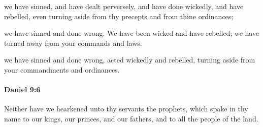 			\begin{versebox}
					\item[BHS] 
					\item[LXX] 
					\item[ASV] we have sinned, and have dealt perversely, and have done wickedly, and have rebelled, even turning aside from thy precepts and from thine ordinances;
					\item[NIV] we have sinned and done wrong. We have been wicked and have rebelled; we have turned away from your commands and laws.
					\item[NRSV] we have sinned and done wrong, acted wickedly and rebelled, turning aside from your commandments and ordinances.
			\end{versebox}

		\paragraph{Daniel 9:6} %
			\label{DANIEL-9-6}

			Neither have we hearkened unto thy servants the prophets, which spake in thy name to our kings, our princes, and our fathers, and to all the people of the land.

